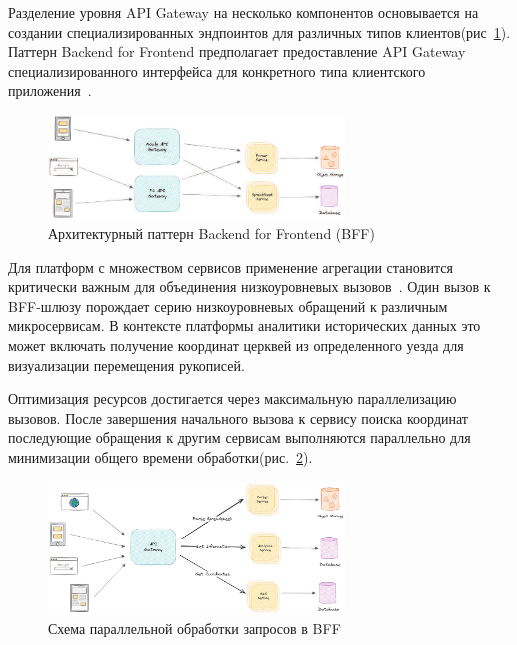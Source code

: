 Разделение уровня API Gateway на несколько компонентов основывается на создании специализированных эндпоинтов для различных типов клиентов(рис~\ref{fig:bff_pattern}). Паттерн Backend for Frontend предполагает предоставление API Gateway специализированного интерфейса для конкретного типа клиентского приложения~\cite{alkhodary2023evaluation}.

\begin{figure}[htbp]
    \centering
    \includegraphics[width=0.7\textwidth]{Dissertation/images/bff}
    \caption{Архитектурный паттерн Backend for Frontend (BFF)}
    \label{fig:bff_pattern}
\end{figure}

Для платформ с множеством сервисов применение агрегации становится критически важным для объединения низкоуровневых вызовов~\cite{newman2015building}.
Один вызов к BFF-шлюзу порождает серию низкоуровневых обращений к различным микросервисам. В контексте платформы аналитики исторических данных это может включать получение координат церквей из определенного уезда для визуализации перемещения рукописей.

Оптимизация ресурсов достигается через максимальную параллелизацию вызовов. После завершения начального вызова к сервису поиска координат последующие обращения к другим сервисам выполняются параллельно для минимизации общего времени обработки(рис.~\ref{fig:bff_parallel_processing}).

\begin{figure}[htbp]
    \centering
    \includegraphics[width=0.7\textwidth]{Dissertation/images/bff_par}
    \caption{Схема параллельной обработки запросов в BFF}
    \label{fig:bff_parallel_processing}
\end{figure}

